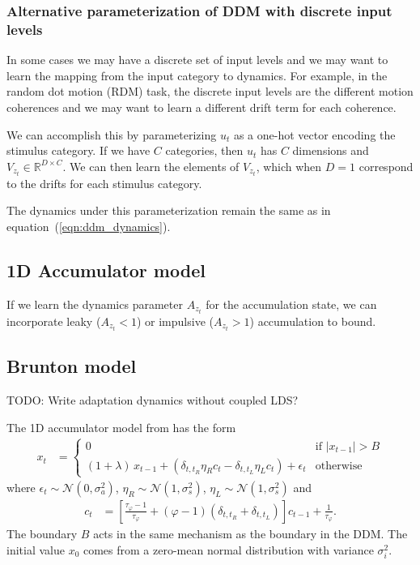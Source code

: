 \documentclass{article}
\begin{document}
\subsubsection{Alternative parameterization of DDM with discrete input levels}
In some cases we may have a discrete set of input levels and we may want to learn the mapping from the input category to dynamics. For example, in the random dot motion (RDM) task, the discrete input levels are the different motion coherences and we may want to learn a different drift term for each coherence. 

We can accomplish this by parameterizing $u_t$ as a one-hot vector encoding the stimulus category. If we have $C$ categories, then $u_t$ has $C$ dimensions and $V_{z_t} \in \mathbb{R}^{D \times C}$. We can then learn the elements of $V_{z_t}$, which when $D = 1$ correspond to the drifts for each stimulus category. 

 The dynamics under this parameterization remain the same as in equation~(\ref{eqn:ddm_dynamics}). 

\subsection{1D Accumulator model}
If we learn the dynamics parameter $A_{z_t}$ for the accumulation state, we can incorporate leaky ($A_{z_t} < 1$) or impulsive ($A_{z_t} > 1$) accumulation to bound. 

\subsection{Brunton model}

TODO: Write adaptation dynamics without coupled LDS?

The 1D accumulator model from \cite{brunton2013rats} has the form
\begin{align*}
x_t &= 
\begin{cases}
0 & \text{if } |x_{t-1}|>B \\
(1 + \lambda) \, x_{t-1} + \left( \delta_{t,t_R} \eta_R c_t - \delta_{t,t_L} \eta_L c_t \right) + \epsilon_t & \text{otherwise}
\end{cases}
\end{align*}
where $\epsilon_t \sim \mathcal{N}(0,\sigma_a^2)$, $\eta_R \sim \mathcal{N}(1, \sigma_s^2)$, $\eta_L \sim \mathcal{N}(1, \sigma_s^2)$ and 
\begin{align*}
c_t &= \left[ \frac{\tau_\varphi - 1}{\tau_\varphi} + (\varphi - 1) (\delta_{t,t_R} + \delta_{t,t_L}) \right] c_{t-1} + \frac{1}{\tau_\varphi}.
\end{align*}
The boundary $B$ acts in the same mechanism as the boundary in the DDM. The initial value $x_0$ comes from a zero-mean normal distribution with variance $\sigma_i^2$.
\end{document}
